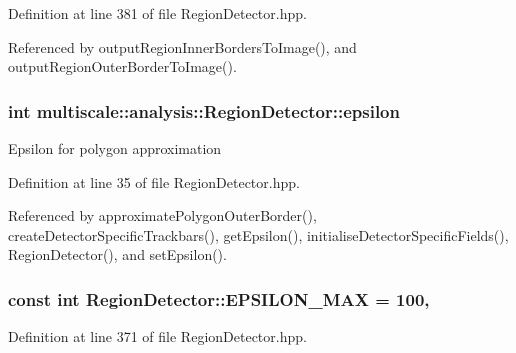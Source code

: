 Definition at line 381 of file Region\-Detector.\-hpp.



Referenced by output\-Region\-Inner\-Borders\-To\-Image(), and output\-Region\-Outer\-Border\-To\-Image().

\hypertarget{classmultiscale_1_1analysis_1_1RegionDetector_acf21910fadd7c6ef2810743a78a0aeb9}{
\subsubsection[{epsilon}]{\setlength{\rightskip}{0pt plus 5cm}int multiscale\-::analysis\-::\-Region\-Detector\-::epsilon\hspace{0.3cm}{\ttfamily [private]}}}\label{classmultiscale_1_1analysis_1_1RegionDetector_acf21910fadd7c6ef2810743a78a0aeb9}
Epsilon for polygon approximation 

Definition at line 35 of file Region\-Detector.\-hpp.



Referenced by approximate\-Polygon\-Outer\-Border(), create\-Detector\-Specific\-Trackbars(), get\-Epsilon(), initialise\-Detector\-Specific\-Fields(), Region\-Detector(), and set\-Epsilon().

\hypertarget{classmultiscale_1_1analysis_1_1RegionDetector_a724d57c0db65696f2ddab415deb1138d}{
\subsubsection[{E\-P\-S\-I\-L\-O\-N\-\_\-\-M\-A\-X}]{\setlength{\rightskip}{0pt plus 5cm}const int Region\-Detector\-::\-E\-P\-S\-I\-L\-O\-N\-\_\-\-M\-A\-X = 100\hspace{0.3cm}{\ttfamily [static]}, {\ttfamily [private]}}}\label{classmultiscale_1_1analysis_1_1RegionDetector_a724d57c0db65696f2ddab415deb1138d}


Definition at line 371 of file Region\-Detector.\-hpp.



